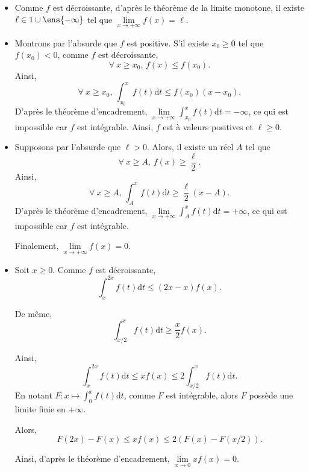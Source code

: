 \begin{elem_sol}
\begin{itemize}
\item Comme $f$ est décroissante, d'après le théorème de la limite monotone, il existe $\ell \in \R \cup \ens{-\infty}$ tel que $\lim\limits_{x\to+\infty} f(x) = \ell$.

\item Montrons par l'absurde que $f$ est positive. S'il existe $x_0 \geq 0$ tel que $f(x_0) < 0$, comme $f$ est décroissante,
\[
\forall\ x \geq x_0,\, f(x) \leq f(x_0).
\]
Ainsi,
\[
\forall\ x \geq x_0,\, \displaystyle\int_{x_0}^x f(t) \mathrm{d}t \leq f(x_0) (x - x_0).
\]
D'après le théorème d'encadrement, $\lim\limits_{x\to+\infty} \displaystyle\int_{x_0}^x f(t) \mathrm{d}t = -\infty$, ce qui est impossible car $f$ est intégrable. Ainsi, $f$ est à valeurs positives et $\ell \geq 0$.

\item Supposons par l'absurde que $\ell > 0$. Alors, il existe un réel $A$ tel que
\[
\forall\ x \geq A,\, f(x) \geq \frac{\ell}{2}.
\]
Ainsi,
\[
\forall\ x \geq A,\, \displaystyle\int_A^x f(t) \mathrm{d}t \geq \frac{\ell}{2} (x - A).
\]
D'après le théorème d'encadrement, $\lim\limits_{x\to+\infty} \displaystyle\int_A^x f(t) \mathrm{d}t = +\infty$, ce qui est impossible car $f$ est intégrable.

Finalement, $\lim\limits_{x\to+\infty} f(x) = 0$.

\item Soit $x \geq 0$. Comme $f$ est décroissante,
\[
\displaystyle\int_x^{2 x} f(t) \mathrm{d}t \leq (2 x - x) f(x).
\]

De même,
\[
\displaystyle\int_{x/2}^x f(t) \mathrm{d}t \geq \frac{x}{2} f(x).
\]

Ainsi,
\[
\displaystyle\int_x^{2 x} f(t) \mathrm{d}t \leq x f(x) \leq 2 \displaystyle\int_{x/2}^x f(t) \mathrm{d}t.
\]
En notant $F : x \mapsto \displaystyle\int_0^x f(t) \mathrm{d}t$, comme $F$ est intégrable, alors $F$ possède une limite finie en $+\infty$.

Alors,
\[
F(2 x) - F(x) \leq x f(x) \leq 2 (F(x) - F(x/2)).
\]

Ainsi, d'après le théorème d'encadrement, $\lim\limits_{x\to 0} x f(x) = 0$.
\end{itemize}
\end{elem_sol}



